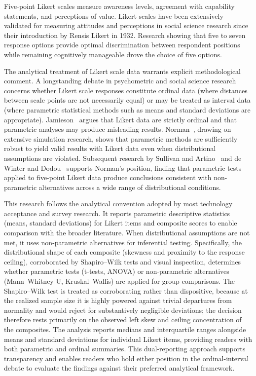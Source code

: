 Five-point Likert scales measure awareness levels, agreement with capability statements, and perceptions of value. Likert scales have been extensively validated for measuring attitudes and perceptions in social science research since their introduction by Rensis Likert in 1932. Research showing that five to seven response options provide optimal discrimination between respondent positions while remaining cognitively manageable drove the choice of five options.

The analytical treatment of Likert scale data warrants explicit methodological comment. A longstanding debate in psychometric and social science research concerns whether Likert scale responses constitute ordinal data (where distances between scale points are not necessarily equal) or may be treated as interval data (where parametric statistical methods such as means and standard deviations are appropriate). Jamieson~\parencite{Jamieson_2004} argues that Likert data are strictly ordinal and that parametric analyses may produce misleading results. Norman~\parencite{Norman_2010}, drawing on extensive simulation research, shows that parametric methods are sufficiently robust to yield valid results with Likert data even when distributional assumptions are violated. Subsequent research by Sullivan and Artino~\parencite{Sullivan_Artino_2013} and de Winter and Dodou~\parencite{deWinter_Dodou_2010} supports Norman's position, finding that parametric tests applied to five-point Likert data produce conclusions consistent with non-parametric alternatives across a wide range of distributional conditions.

This research follows the analytical convention adopted by most technology acceptance and survey research. It reports parametric descriptive statistics (means, standard deviations) for Likert items and composite scores to enable comparison with the broader literature. When distributional assumptions are not met, it uses non-parametric alternatives for inferential testing. Specifically, the distributional shape of each composite (skewness and proximity to the response ceiling), corroborated by Shapiro--Wilk tests and visual inspection, determines whether parametric tests (t-tests, ANOVA) or non-parametric alternatives (Mann--Whitney U, Kruskal--Wallis) are applied for group comparisons. The Shapiro--Wilk test is treated as corroborating rather than dispositive, because at the realized sample size it is highly powered against trivial departures from normality and would reject for substantively negligible deviations; the decision therefore rests primarily on the observed left skew and ceiling concentration of the composites. The analysis reports medians and interquartile ranges alongside means and standard deviations for individual Likert items, providing readers with both parametric and ordinal summaries. This dual-reporting approach supports transparency and enables readers who hold either position in the ordinal-interval debate to evaluate the findings against their preferred analytical framework.

